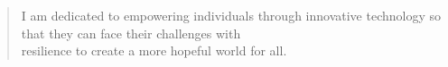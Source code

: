 \begin{minipage}{13.5cm}
	\begin{quote}
		I am dedicated to empowering individuals through innovative technology so that they can face their challenges with\\resilience to create a more hopeful world for all.
	\end{quote}
\end{minipage}